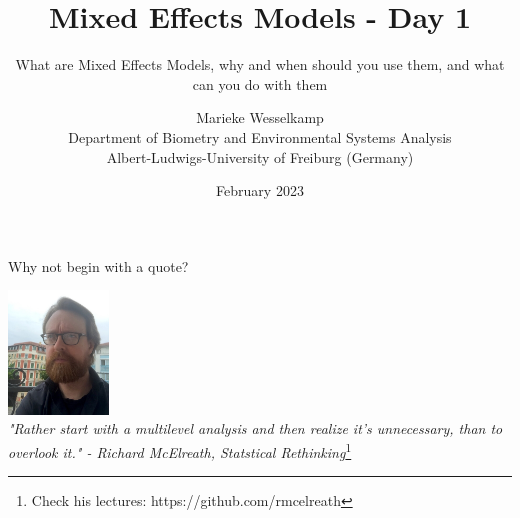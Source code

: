 \documentclass{beamer}
\title{Mixed Effects Models - Day 1}
\subtitle{What are Mixed Effects Models, why and when should you use them, and what can you do with them}
\author{Marieke Wesselkamp \\ Department of Biometry and Environmental Systems Analysis \\ Albert-Ludwigs-University of Freiburg (Germany)}
\date{February 2023}
\begin{document}
\begin{frame}
  \titlepage
\end{frame}

\begin{frame}{Why not begin with a quote?}
  \begin{center}
    \includegraphics[width=0.2\textwidth]{lectures/day_1_intro_to_mems/figures/mcelreath2020.jpg}
    \\
    \bigskip
    \textit{"Rather start with a multilevel analysis and then realize it's unnecessary, than to overlook it." - Richard McElreath, Statstical Rethinking}\footnote{Check his lectures: https://github.com/rmcelreath}
  \end{center}
\end{frame}
\end{document}
